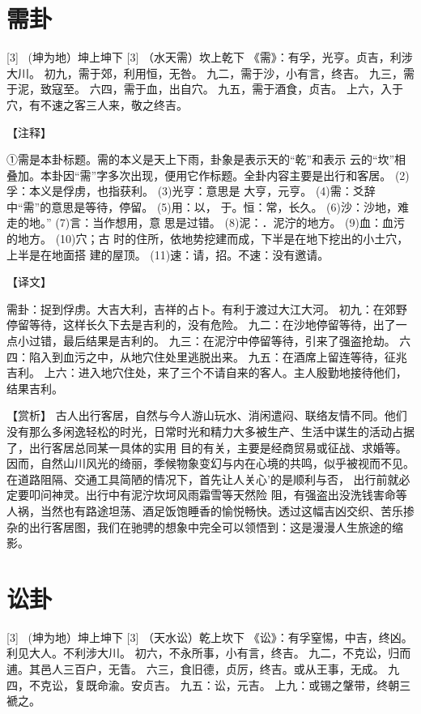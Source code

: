 \documentclass[12pt,UTF8]{ctexbook}
\begin{document}
\chapter{需卦}
[3] \ (坤为地）坤上坤下
[3]
（水天需）坎上乾下
《需》：有孚，光亨。贞吉，利涉大川。
初九，需于郊，利用恒，无咎。
九二，需于沙，小有言，终吉。
九三，需于泥，致寇至。
六四，需于血，出自穴。
九五，需于酒食，贞吉。
上六，入于穴，有不速之客三人来，敬之终吉。

【注释】

①需是本卦标题。需的本义是天上下雨，卦象是表示天的“乾”和表示 云的“坎”相叠加。本卦因“需”字多次出现，便用它作标题。全卦内容主要是出行和客居。
(2)孚：本义是俘虏，也指获利。
(3)光亨：意思是 大亨，元亨。
(4)需：爻辞中“需”的意思是等待，停留。
(5)用：以， 于。恒：常，长久。
(6)沙：沙地，难走的地。”
(7)言：当作想用，意 思是过错。
(8)泥：．泥泞的地方。
(9)血：血污的地方。
(10)穴；古 时的住所，依地势挖建而成，下半是在地下挖出的小土穴，上半是在地面搭 建的屋顶。
(11)速：请，招。不速：没有邀请。

【译文】

需卦：捉到俘虏。大吉大利，吉祥的占卜。有利于渡过大江大河。
初九：在郊野停留等待，这样长久下去是吉利的，没有危险。
九二：在沙地停留等待，出了一点小过错，最后结果是吉利的。
九三：在泥泞中停留等待，引来了强盗抢劫。
六四：陷入到血污之中，从地穴住处里逃脱出来。
九五：在酒席上留连等待，征兆吉利。
上六：进入地穴住处，来了三个不请自来的客人。主人殷勤地接待他们，结果吉利。

【赏析】
古人出行客居，自然与今人游山玩水、消闲遣闷、联络友情不同。他们没有那么多闲逸轻松的时光，日常时光和精力大多被生产、生活中谋生的活动占据了，出行客居总同某一具体的实用 目的有关，主要是经商贸易或征战、求婚等。因而，自然山川风光的绮丽，季候物象变幻与内在心境的共鸣，似乎被视而不见。在道路阻隔、交通工具简陋的情况下，首先让人关心’的是顺利与否， 出行前就必定要叩问神灵。出行中有泥泞坎坷风雨霜雪等天然险 阻，有强盗出没洗钱害命等人祸，当然也有路途坦荡、酒足饭饱睡香的愉悦畅快。透过这幅吉凶交织、苦乐掺杂的出行客居图，我们在驰骋的想象中完全可以领悟到：这是漫漫人生旅途的缩影。 

\chapter{讼卦}
[3] \ (坤为地）坤上坤下
[3]
（天水讼）乾上坎下
《讼》：有孚窒惕，中吉，终凶。利见大人。不利涉大川。
初六，不永所事，小有言，终吉。
九二，不克讼，归而逋。其邑人三百户，无眚。
六三，食旧德，贞厉，终吉。或从王事，无成。
九四，不克讼，复既命渝。安贞吉。
九五：讼，元吉。
上九：或锡之鞶带，终朝三褫之。
\end{document}
